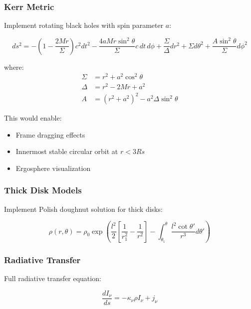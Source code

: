 \documentclass[12pt,a4paper]{article}
\theoremstyle{definition}
\theoremstyle{remark}
\begin{document}
\subsubsection{Kerr Metric}

Implement rotating black holes with spin parameter $a$:

\begin{equation}
    ds^2 = -\left(1 - \frac{2Mr}{\Sigma}\right)c^2dt^2 - \frac{4aMr\sin^2\theta}{\Sigma}c \, dt \, d\phi + \frac{\Sigma}{\Delta}dr^2 + \Sigma d\theta^2 + \frac{A\sin^2\theta}{\Sigma}d\phi^2
\end{equation}

where:
\begin{align}
    \Sigma &= r^2 + a^2\cos^2\theta \\
    \Delta &= r^2 - 2Mr + a^2 \\
    A &= (r^2 + a^2)^2 - a^2\Delta\sin^2\theta
\end{align}

This would enable:
\begin{itemize}
    \item Frame dragging effects
    \item Innermost stable circular orbit at $r < 3Rs$
    \item Ergosphere visualization
\end{itemize}

\subsubsection{Thick Disk Models}

Implement Polish doughnut solution for thick disks:

\begin{equation}
    \rho(r, \theta) = \rho_0 \exp\left(\frac{l^2}{2}\left[\frac{1}{r_1^2} - \frac{1}{r^2}\right] - \int_{\theta_1}^{\theta}\frac{l^2\cot\theta'}{r^3}d\theta'\right)
\end{equation}

\subsubsection{Radiative Transfer}

Full radiative transfer equation:

\begin{equation}
    \frac{dI_\nu}{ds} = -\kappa_\nu \rho I_\nu + j_\nu
\end{equation}
\end{document}
